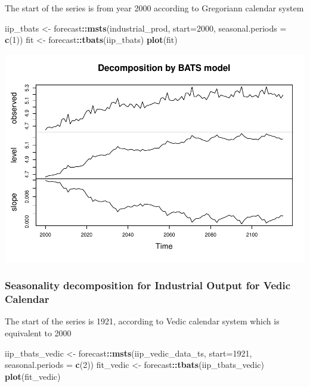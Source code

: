 \documentclass[
]{article}
\newenvironment{Shaded}{\begin{snugshade}}{\end{snugshade}}
\newcommand{\AttributeTok}[1]{\textcolor[rgb]{0.13,0.29,0.53}{#1}}
\newcommand{\DecValTok}[1]{\textcolor[rgb]{0.00,0.00,0.81}{#1}}
\newcommand{\FunctionTok}[1]{\textcolor[rgb]{0.13,0.29,0.53}{\textbf{#1}}}
\newcommand{\NormalTok}[1]{#1}
\newcommand{\OtherTok}[1]{\textcolor[rgb]{0.56,0.35,0.01}{#1}}
\newcommand{\SpecialCharTok}[1]{\textcolor[rgb]{0.81,0.36,0.00}{\textbf{#1}}}
\begin{document}
The start of the series is from year 2000 according to Gregoriann
calendar system

\begin{Shaded}
\begin{Highlighting}[]
\NormalTok{iip\_tbats }\OtherTok{\textless{}{-}}\NormalTok{ forecast}\SpecialCharTok{::}\FunctionTok{msts}\NormalTok{(industrial\_prod, }\AttributeTok{start=}\DecValTok{2000}\NormalTok{, }\AttributeTok{seasonal.periods =} \FunctionTok{c}\NormalTok{(}\DecValTok{1}\NormalTok{))}
\NormalTok{fit }\OtherTok{\textless{}{-}}\NormalTok{ forecast}\SpecialCharTok{::}\FunctionTok{tbats}\NormalTok{(iip\_tbats)}
\FunctionTok{plot}\NormalTok{(fit)}
\end{Highlighting}
\end{Shaded}

\includegraphics{regressors_of_diwali_seasonality_for_industrial_production_files/figure-latex/unnamed-chunk-14-1.pdf}

\hypertarget{seasonality-decomposition-for-industrial-output-for-vedic-calendar}{%
\subsubsection{Seasonality decomposition for Industrial Output for Vedic
Calendar}\label{seasonality-decomposition-for-industrial-output-for-vedic-calendar}}

The start of the series is 1921, according to Vedic calendar system
which is equivalent to 2000

\begin{Shaded}
\begin{Highlighting}[]
\NormalTok{iip\_tbats\_vedic }\OtherTok{\textless{}{-}}\NormalTok{ forecast}\SpecialCharTok{::}\FunctionTok{msts}\NormalTok{(iip\_vedic\_data\_ts, }\AttributeTok{start=}\DecValTok{1921}\NormalTok{, }\AttributeTok{seasonal.periods =} \FunctionTok{c}\NormalTok{(}\DecValTok{2}\NormalTok{))}
\NormalTok{fit\_vedic }\OtherTok{\textless{}{-}}\NormalTok{ forecast}\SpecialCharTok{::}\FunctionTok{tbats}\NormalTok{(iip\_tbats\_vedic)}
\FunctionTok{plot}\NormalTok{(fit\_vedic)}
\end{Highlighting}
\end{Shaded}
\end{document}
